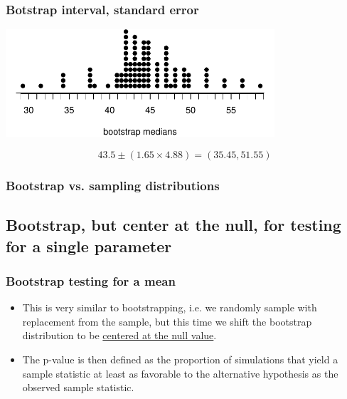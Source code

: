 \documentclass[slidestop,compress,mathserif,12pt,t,professionalfonts,xcolor=table]{beamer}
\newcommand{\soln}[1]{\textit{#1}}
\begin{document}
\begin{frame}
\frametitle{Botstrap interval, standard error}


\begin{center}
\includegraphics[width = 0.75\textwidth]{figures/movies/horror_boot_med_dot}
\end{center}

\pause

\soln{\[ 43.5 \pm (1.65 \times 4.88) = (35.45, 51.55) \] }

\end{frame}


\begin{frame}
\frametitle{Bootstrap vs. sampling distributions}

\vfill


\vfill

\end{frame}


\subsection{Bootstrap, but center at the null, for testing for a single parameter}
\label{mi2boot}


\begin{frame}
\frametitle{Bootstrap testing for a mean}

\begin{itemize}

\item This is very similar to bootstrapping, i.e. we randomly sample with replacement from the sample, but this time we shift the bootstrap distribution to be \underline{centered at the null value}. 

\pause

\item The p-value is then defined as the proportion of simulations that yield a sample statistic at least as favorable to the alternative hypothesis as the observed sample statistic.

\end{itemize}

\end{frame}
\end{document}
